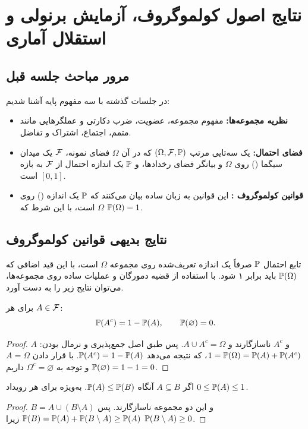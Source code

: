 \chapter{نتایج اصول کولموگروف، آزمایش برنولی و استقلال آماری}

\section{مرور مباحث جلسه قبل}

در جلسات گذشته با سه مفهوم پایه آشنا شدیم:
\begin{itemize}
\item \textbf{نظریه مجموعه‌ها:} مفهوم مجموعه، عضویت، ضرب دکارتی و عملگرهایی مانند متمم، اجتماع، اشتراک و تفاضل.
\item \textbf{فضای احتمال:} یک سه‌تایی مرتب $(\Omega,\mathcal{F},\mathbb{P})$ که در آن $\Omega$ فضای نمونه، $\mathcal{F}$ یک میدان سیگما () روی $\Omega$ و بیانگر فضای رخدادها، و $\mathbb{P}$ یک اندازه احتمال از $\mathcal{F}$ به بازه $[0,1]$ است.
\item \textbf{قوانین کولموگروف :} این قوانین به زبان ساده بیان می‌کنند که $\mathbb{P}$ یک اندازه () روی $\Omega$ است، با این شرط که $\mathbb{P}(\Omega)=1$.
\end{itemize}

\section{نتایج بدیهی قوانین کولموگروف}

تابع احتمال $\mathbb{P}$ صرفاً یک اندازه تعریف‌شده روی مجموعه $\Omega$ است، با این قید اضافی که $\mathbb{P}(\Omega)$ باید برابر ۱ شود. با استفاده از قضیه دمورگان و عملیات ساده روی مجموعه‌ها، می‌توان نتایج زیر را به دست آورد.

\begin{theorem}
برای هر $A\in\mathcal{F}$:
\[\mathbb{P}(A^c)=1-\mathbb{P}(A),\qquad \mathbb{P}(\varnothing)=0.\]
\end{theorem}
\begin{proof}
$A$ و $A^c$ ناسازگارند و $A\cup A^c=\Omega$. پس طبق اصل جمع‌پذیری و نرمال بودن:
$1=\mathbb{P}(\Omega)=\mathbb{P}(A)+\mathbb{P}(A^c)$،
که نتیجه می‌دهد $\mathbb{P}(A^c)=1-\mathbb{P}(A)$. با قرار دادن $A=\Omega$ و توجه به $\Omega^c=\varnothing$ داریم $\mathbb{P}(\varnothing)=1-1=0$.
\end{proof}

\begin{theorem}[یکنوایی]
اگر $A\subseteq B$ آنگاه $\mathbb{P}(A)\le\mathbb{P}(B)$. به‌ویژه برای هر رویداد $0\le \mathbb{P}(A)\le 1$.
\end{theorem}
\begin{proof}
$B=A\cup(B\setminus A)$ و این دو مجموعه ناسازگارند. پس $\mathbb{P}(B)=\mathbb{P}(A)+\mathbb{P}(B\setminus A)\ge\mathbb{P}(A)$ زیرا $\mathbb{P}(B\setminus A)\ge0$.
\end{proof}

